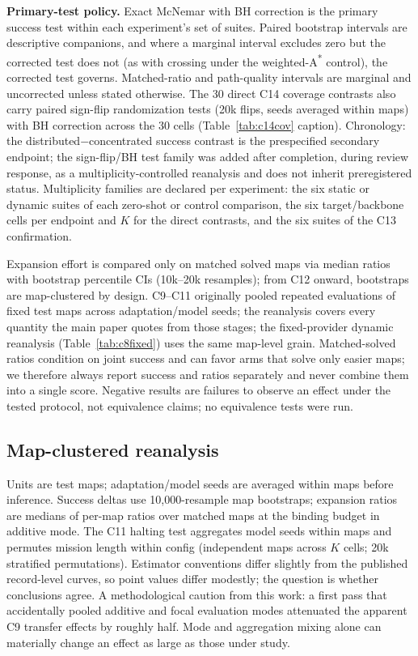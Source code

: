 \documentclass[letterpaper]{article} %
\newcommand{\stage}[1]{\textsc{#1}}
\begin{document}
\textbf{Primary-test policy.} Exact McNemar with BH correction is the primary success test within each experiment's set of suites. Paired bootstrap intervals are descriptive companions, and where a marginal interval excludes zero but the corrected test does not (as with crossing under the weighted-A\textsuperscript{*} control), the corrected test governs. Matched-ratio and path-quality intervals are marginal and uncorrected unless stated otherwise. The 30 direct \stage{C14} coverage contrasts also carry paired sign-flip randomization tests (20k flips, seeds averaged within maps) with BH correction across the 30 cells (Table~\ref{tab:c14cov} caption). Chronology: the distributed$-$concentrated success contrast is the prespecified secondary endpoint; the sign-flip/BH test family was added after completion, during review response, as a multiplicity-controlled reanalysis and does not inherit preregistered status. Multiplicity families are declared per experiment: the six static or dynamic suites of each zero-shot or control comparison, the six target/backbone cells per endpoint and $K$ for the direct contrasts, and the six suites of the \stage{C13} confirmation.

Expansion effort is compared only on matched solved maps via median ratios with bootstrap percentile CIs (10k--20k resamples); from \stage{C12} onward, bootstraps are map-clustered by design. \stage{C9}--\stage{C11} originally pooled repeated evaluations of fixed test maps across adaptation/model seeds; the reanalysis covers every quantity the main paper quotes from those stages; the fixed-provider dynamic reanalysis (Table~\ref{tab:c8fixed}) uses the same map-level grain. Matched-solved ratios condition on joint success and can favor arms that solve only easier maps; we therefore always report success and ratios separately and never combine them into a single score. Negative results are failures to observe an effect under the tested protocol, not equivalence claims; no equivalence tests were run.

\subsection{Map-clustered reanalysis}

Units are test maps; adaptation/model seeds are averaged within maps before inference. Success deltas use 10{,}000-resample map bootstraps; expansion ratios are medians of per-map ratios over matched maps at the binding budget in additive mode. The \stage{C11} halting test aggregates model seeds within maps and permutes mission length within config (independent maps across $K$ cells; 20k stratified permutations). Estimator conventions differ slightly from the published record-level curves, so point values differ modestly; the question is whether conclusions agree. A methodological caution from this work: a first pass that accidentally pooled additive and focal evaluation modes attenuated the apparent \stage{C9} transfer effects by roughly half. Mode and aggregation mixing alone can materially change an effect as large as those under study.
\end{document}

